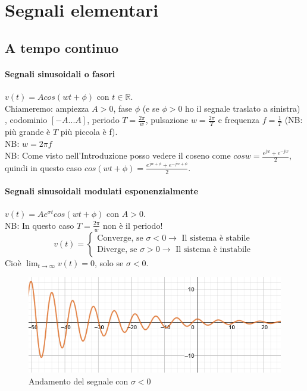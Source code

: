 \chapter{Segnali elementari}
\section{A tempo continuo}

\subsubsection{Segnali sinusoidali o fasori}

$ v(t)= Acos(wt+ \phi)$ con $t \in \mathbb{R}$.\\
Chiameremo: ampiezza $ A>0$, fase $ \phi $ (e se $ \phi > 0$ ho il segnale traslato a sinistra) , codominio $ [-A...A]$, periodo $ T = \frac{2 \pi}{w} $, pulsazione $w=\frac{2 \pi}{T} $ e frequenza $ f = \frac{1}{T}$ (NB: più grande è $T $ più piccola è f).\\
NB: $ w = 2 \pi f $ \\
NB: Come visto nell'Introduzione posso vedere il coseno come $  cosw = \frac{e^{jw} + e^{-jw}}{2}  $, quindi in questo caso $ cos(wt + \phi) = \frac{e^{jw+ \phi} + e^{-jw + \phi}}{2} $.\\

\subsubsection{Segnali sinusoidali modulati esponenzialmente}

$ v(t)= A e^{ \sigma t} cos(wt+ \phi)$ con $A>0$.\\
NB: In questo caso $T = \frac{2 \pi}{w} $ non è il periodo!\\

\begin{equation*}
v(t)=
\begin{cases} 
 \mbox{Converge, se } \sigma < 0 \rightarrow \mbox{ Il sistema è stabile }\\ 
 \mbox{Diverge, se } \sigma > 0 \rightarrow \mbox{ Il sistema è instabile}
\end{cases} 
\end{equation*}
Cioè $  \lim_{t \to \infty} v(t)=0$, solo se $ \sigma <0$.

\begin{figure}[h]
	\centering
	\includegraphics[scale=0.75]{immagini/segnSinNeg}
	\caption{ Andamento del segnale con $ \sigma <0$ }
	\label{fig: segnSinNeg}
\end{figure}

